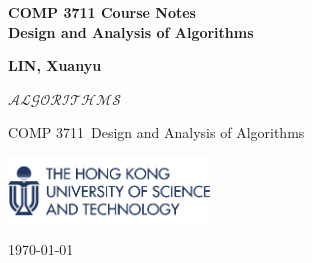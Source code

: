 \documentclass[10pt]{article}
\newcommand\course{COMP 3711}
\begin{document}
	

\begin{titlepage}
	\begin{center}
		\vspace*{3cm}
		
		\Huge
		\hrulefill
		\vspace{1cm}
		
		\huge
		\textbf{COMP 3711 Course Notes\\}
		\vspace{1cm}
		\textbf{Design and Analysis of Algorithms}
		\vspace{1cm}
		
		\hrulefill
		
		\vspace{1.5cm}
		\Large

		\textbf{LIN, Xuanyu}
		
		\vfill
		
		$\mathscr{ALGORITHMS}$
		
		\vspace{1cm}
		
		\course \ Design and Analysis of Algorithms
		
		\vspace{1cm}
		
		\includegraphics[width=0.4\textwidth]{logo-hkust.png}
		\\
		
		\Large
		
		\today
		
	\end{center}
\end{titlepage}

\end{document}
